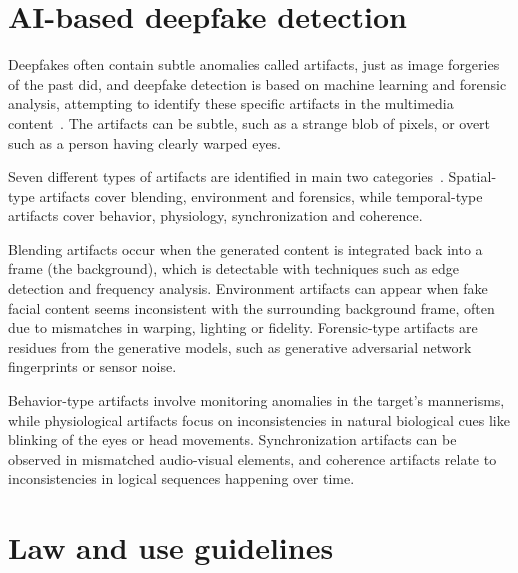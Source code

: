 \section{AI-based deepfake detection}
\begin{comment}


    
\end{comment}

Deepfakes often contain subtle anomalies called artifacts, just as image forgeries of the past did, and deepfake detection is based on machine learning and forensic analysis, attempting to identify these specific artifacts in the multimedia content~\citep{mirsky_Creation_Detection_Deepfakes_2021}. The artifacts can be subtle, such as a strange blob of pixels, or overt such as a person having clearly warped eyes.

Seven different types of artifacts are identified in main two categories~\citep{mirsky_Creation_Detection_Deepfakes_2021}. Spatial-type artifacts cover blending, environment and forensics, while temporal-type artifacts cover behavior, physiology, synchronization and coherence.

Blending artifacts occur when the generated content is integrated back into a frame (the background), which is detectable with techniques such as edge detection and frequency analysis. Environment artifacts can appear when fake facial content seems inconsistent with the surrounding background frame, often due to mismatches in warping, lighting or fidelity. Forensic-type artifacts are residues from the generative models, such as generative adversarial network fingerprints or sensor noise.

Behavior-type artifacts involve monitoring anomalies in the target's mannerisms, while physiological artifacts focus on inconsistencies in natural biological cues like blinking of the eyes or head movements. Synchronization artifacts can be observed in mismatched audio-visual elements, and coherence artifacts relate to inconsistencies in logical sequences happening over time.






\section{Law and use guidelines}
\begin{comment}
    


\end{comment}

